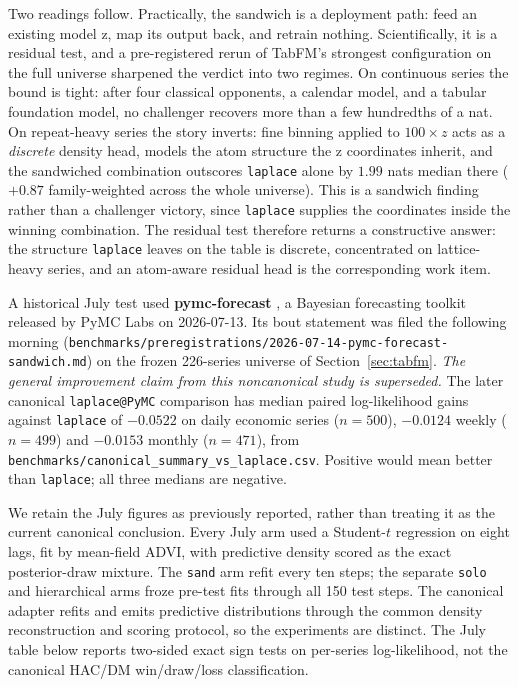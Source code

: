 \documentclass[article]{jss}
\providecommand{\pkg}[1]{\textbf{#1}}
\providecommand{\code}[1]{\texttt{#1}}
\begin{document}
Two readings follow. Practically, the sandwich is a deployment path:
feed an existing model z, map its output back, and retrain nothing. Scientifically, it is a
residual test, and a pre-registered rerun of TabFM's strongest
configuration on the full universe sharpened the verdict into two
regimes. On continuous series the bound is tight: after four classical
opponents, a calendar model, and a tabular foundation model, no
challenger recovers more than a few hundredths of a nat. On
repeat-heavy series the story inverts: fine binning applied to $100
\times z$ acts as a \emph{discrete} density head, models the atom
structure the z coordinates inherit, and the sandwiched combination
outscores \code{laplace} alone by $1.99$ nats median there ($+0.87$
family-weighted across the whole universe). This is a sandwich finding
rather than a challenger victory, since \code{laplace} supplies the
coordinates inside the winning combination. The residual test therefore returns a constructive answer: the
structure \code{laplace} leaves on the table is discrete, concentrated
on lattice-heavy series, and an atom-aware residual head is the
corresponding work item.

A historical July test used \pkg{pymc-forecast}
\citep{pymcforecast2026}, a Bayesian forecasting toolkit released by
PyMC Labs on 2026-07-13. Its bout statement was filed the following
morning
(\code{benchmarks/preregistrations/2026-07-14-pymc-forecast-sandwich.md})
on the frozen 226-series universe of Section~\ref{sec:tabfm}.
\emph{The general improvement claim from this noncanonical study is
superseded.} The later canonical \code{laplace@PyMC} comparison has
median paired log-likelihood gains against \code{laplace} of
$-0.0522$ on daily economic series ($n=500$), $-0.0124$ weekly ($n=499$)
and $-0.0153$ monthly ($n=471$), from
\code{benchmarks/canonical\_summary\_vs\_laplace.csv}. Positive would mean
better than \code{laplace}; all three medians are negative.

We retain the July figures as previously reported, rather than treating
it as the current canonical conclusion. Every July arm used a Student-$t$
regression on eight lags, fit by mean-field ADVI, with predictive density
scored as the exact posterior-draw mixture. The \code{sand} arm refit
every ten steps; the separate \code{solo} and hierarchical arms froze
pre-test fits through all 150 test steps. The canonical adapter refits
and emits predictive distributions through the common density
reconstruction and scoring protocol, so the experiments are distinct.
The July table below reports two-sided exact sign tests on per-series
log-likelihood, not the canonical HAC/DM win/draw/loss classification.
\end{document}
